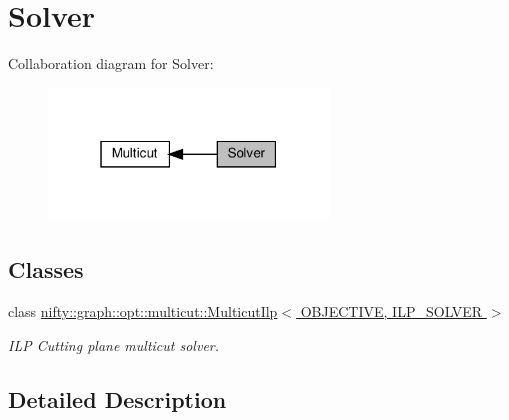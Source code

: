 \hypertarget{group__group__multicut__solver}{}\section{Solver}
\label{group__group__multicut__solver}
Collaboration diagram for Solver\+:
\nopagebreak
\begin{figure}[H]
\begin{center}
\leavevmode
\includegraphics[width=211pt]{group__group__multicut__solver}
\end{center}
\end{figure}
\subsection*{Classes}
\begin{DoxyCompactItemize}
\item 
class \hyperlink{classnifty_1_1graph_1_1opt_1_1multicut_1_1MulticutIlp}{nifty\+::graph\+::opt\+::multicut\+::\+Multicut\+Ilp$<$ O\+B\+J\+E\+C\+T\+I\+V\+E, I\+L\+P\+\_\+\+S\+O\+L\+V\+E\+R $>$}
\begin{DoxyCompactList}\small\item\em I\+LP Cutting plane multicut solver. \end{DoxyCompactList}\end{DoxyCompactItemize}


\subsection{Detailed Description}
